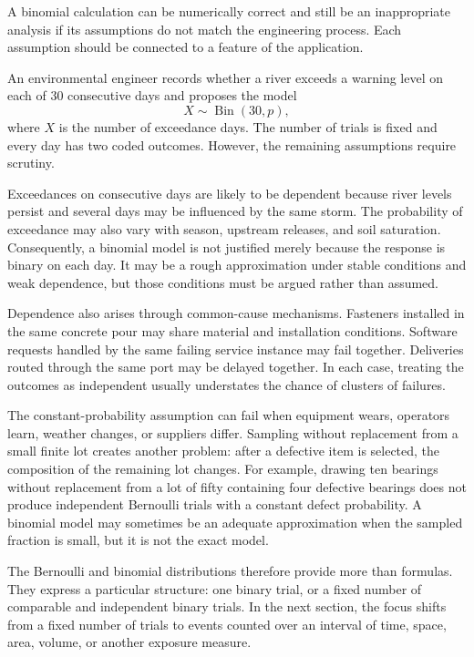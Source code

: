 A binomial calculation can be numerically correct and still be an inappropriate analysis if its assumptions do not match the engineering process. Each assumption should be connected to a feature of the application.

\pagebreak
\begin{example}\par\noindent
An environmental engineer records whether a river exceeds a warning level on each of $30$ consecutive days and proposes the model
\[
X\sim\operatorname{Bin}(30,p),
\]
where $X$ is the number of exceedance days. The number of trials is fixed and every day has two coded outcomes. However, the remaining assumptions require scrutiny.

Exceedances on consecutive days are likely to be dependent because river levels persist and several days may be influenced by the same storm. The probability of exceedance may also vary with season, upstream releases, and soil saturation. Consequently, a binomial model is not justified merely because the response is binary on each day. It may be a rough approximation under stable conditions and weak dependence, but those conditions must be argued rather than assumed.
\end{example}

Dependence also arises through common-cause mechanisms. Fasteners installed in the same concrete pour may share material and installation conditions. Software requests handled by the same failing service instance may fail together. Deliveries routed through the same port may be delayed together. In each case, treating the outcomes as independent usually understates the chance of clusters of failures.

The constant-probability assumption can fail when equipment wears, operators learn, weather changes, or suppliers differ. Sampling without replacement from a small finite lot creates another problem: after a defective item is selected, the composition of the remaining lot changes. For example, drawing ten bearings without replacement from a lot of fifty containing four defective bearings does not produce independent Bernoulli trials with a constant defect probability. A binomial model may sometimes be an adequate approximation when the sampled fraction is small, but it is not the exact model.

The Bernoulli and binomial distributions therefore provide more than formulas. They express a particular structure: one binary trial, or a fixed number of comparable and independent binary trials. In the next section, the focus shifts from a fixed number of trials to events counted over an interval of time, space, area, volume, or another exposure measure.

